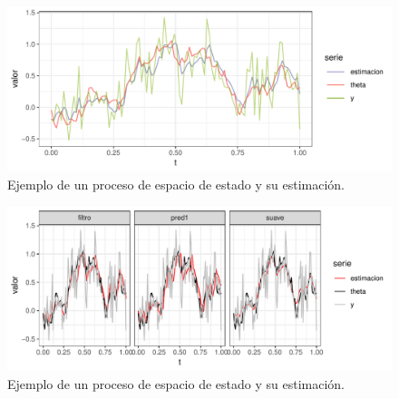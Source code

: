 \documentclass[12pt]{article}\usepackage[]{graphicx}\usepackage[]{color}
\makeatletter
\def\maxwidth{ %
  \ifdim\Gin@nat@width>\linewidth
    \linewidth
  \else
    \Gin@nat@width
  \fi
}
\newenvironment{knitrout}{}{} %
\makeatother
\begin{document}
\begin{knitrout}
\color{fgcolor}\begin{figure}

{\centering \includegraphics[width=\maxwidth]{figure/graf7-1} 

}

\caption[Ejemplo de un proceso de espacio de estado y su estimación]{Ejemplo de un proceso de espacio de estado y su estimación.}\label{fig:graf7}
\end{figure}


\end{knitrout}

\begin{knitrout}
\color{fgcolor}\begin{figure}

{\centering \includegraphics[width=\maxwidth]{figure/graf7b-1} 

}

\caption[Ejemplo de un proceso de espacio de estado y su estimación]{Ejemplo de un proceso de espacio de estado y su estimación.}\label{fig:graf7b}
\end{figure}


\end{knitrout}


\end{document}
